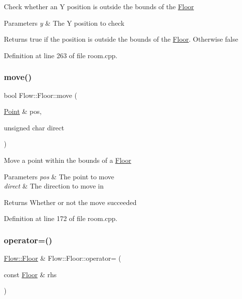 Check whether an Y position is outside the bounds of the \hyperlink{class_flow_1_1_floor}{Floor} 
\begin{DoxyParams}{Parameters}
{\em y} & The Y position to check \\
\hline
\end{DoxyParams}
\begin{DoxyReturn}{Returns}
true if the position is outside the bounds of the \hyperlink{class_flow_1_1_floor}{Floor}. Otherwise false 
\end{DoxyReturn}


Definition at line 263 of file room.\+cpp.

\hypertarget{class_flow_1_1_floor_a257b06bf103cca41a2b6e42692fb4fbe}{}\label{class_flow_1_1_floor_a257b06bf103cca41a2b6e42692fb4fbe} 
\subsubsection{\texorpdfstring{move()}{move()}}
{\footnotesize\ttfamily bool Flow\+::\+Floor\+::move (\begin{DoxyParamCaption}\item[{\hyperlink{struct_flow_1_1_point}{Point} \&}]{pos,  }\item[{unsigned char}]{direct }\end{DoxyParamCaption})}

Move a point within the bounds of a \hyperlink{class_flow_1_1_floor}{Floor} 
\begin{DoxyParams}{Parameters}
{\em pos} & The point to move \\
\hline
{\em direct} & The direction to move in \\
\hline
\end{DoxyParams}
\begin{DoxyReturn}{Returns}
Whether or not the move succeeded 
\end{DoxyReturn}


Definition at line 172 of file room.\+cpp.

\hypertarget{class_flow_1_1_floor_a0d053f735a848823fcb7e2f8650090da}{}\label{class_flow_1_1_floor_a0d053f735a848823fcb7e2f8650090da} 
\subsubsection{\texorpdfstring{operator=()}{operator=()}}
{\footnotesize\ttfamily \hyperlink{class_flow_1_1_floor}{Flow\+::\+Floor} \& Flow\+::\+Floor\+::operator= (\begin{DoxyParamCaption}\item[{const \hyperlink{class_flow_1_1_floor}{Floor} \&}]{rhs }\end{DoxyParamCaption})}

